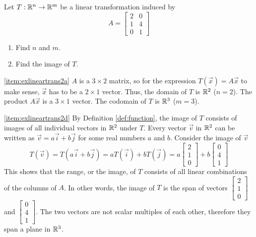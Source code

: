 \documentclass{ximera}
\begin{document}
\begin{example}\label{ex:lineartrans2}
Let $T:\mathbb{R}^n\rightarrow\mathbb{R}^m$ be a linear transformation induced by $$A=\begin{bmatrix}
2&0\\
1&4\\
0&1
\end{bmatrix}$$
\begin{enumerate}
\item \label{item:exlineartrans2a}
Find $n$ and $m$.
\item \label{item:exlineartrans2d}
Find the image of $T$.
\end{enumerate}

\begin{explanation}
\ref{item:exlineartrans2a} $A$ is a $3\times 2$ matrix, so for the expression $T(\vec{x})=A\vec{x}$ to make sense, $\vec{x}$ has to be a $2\times 1$ vector.  Thus, the domain of $T$ is $\mathbb{R}^2$ ($n=2$).  The product $A\vec{x}$ is a $3\times 1$ vector.  The codomain of $T$ is $\mathbb{R}^3$ ($m=3$).

\ref{item:exlineartrans2d}  By Definition \ref{def:function}, the image of $T$ consists of images of all individual vectors in $\mathbb{R}^2$ under $T$.  Every vector $\vec{v}$  in $\mathbb{R}^2$ can be written as $\vec{v}=a\vec{i}+b\vec{j}$ for some real numbers  $a$ and $b$.  Consider the image of $\vec{v}$
$$T(\vec{v})=T(a\vec{i}+b\vec{j})=aT(\vec{i})+bT(\vec{j})=a\begin{bmatrix}2\\1\\0\end{bmatrix}+b\begin{bmatrix}0\\4\\1\end{bmatrix}$$
This shows that the range, or the image, of $T$ consists of all linear combinations of the columns of $A$.  In other words, the image of $T$ is the span of vectors $\begin{bmatrix}2\\1\\0\end{bmatrix}$ and $\begin{bmatrix}0\\4\\1\end{bmatrix}$. The two vectors are not scalar multiples of each other, therefore they span a plane in $\mathbb{R}^3$.
\end{explanation}  
\end{example}
 
\end{document}
